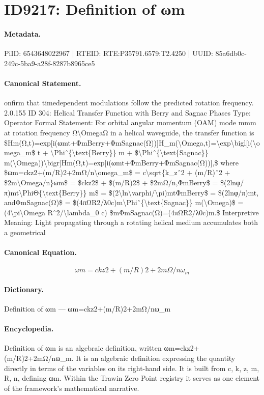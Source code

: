 \section*{ID9217: Definition of ωm}
\paragraph{Metadata.}
PiID: 6543648022967 | RTEID: RTE:P35791.6579:T2.4250 | UUID: 85a6db0c-249c-5ba9-a28f-8287b8965ce5

\paragraph{Canonical Statement.}
onfirm that timedependent modulations follow the predicted rotation frequency. 2.0.155 ID 304: Helical Transfer Function with Berry and Sagnac Phases Type: Operator Formal Statement: For orbital angular momentum (OAM) mode mmm at rotation frequency Ω\textbackslash{}OmegaΩ in a helical waveguide, the transfer function is \$Hm(Ω,t)=exp[i(ωmt+ΦmBerry+ΦmSagnac(Ω))]H\_m(\textbackslash{}Omega,t)=\textbackslash{}exp\textbackslash{}bigl[i(\textbackslash{}omega\_m\$ t + \textbackslash{}Phiˆ\{\textbackslash{}text\{Berry\}\} m + \$\textbackslash{}Phiˆ\{\textbackslash{}text\{Sagnac\}\} m(\textbackslash{}Omega))\textbackslash{}bigr]Hm(Ω,t)=exp[i(ωmt+ΦmBerry+ΦmSagnac(Ω))],\$ where \$ωm=ckz2+(m/R)2+2mΩ/n\textbackslash{}omega\_m\$ = c\textbackslash{}sqrt\{k\_zˆ2 + (m/R)ˆ2 + \$2m\textbackslash{}Omega/n\}ωm\$ = \$ckz2\$ + \$(m/R)2\$ + \$2mΩ/n,ΦmBerry\$ = \$(2lnφ/π)mt\textbackslash{}PhiΘ\{\textbackslash{}text\{Berry\}\} m\$ = \$(2\textbackslash{}ln\textbackslash{}varphi/\textbackslash{}pi)mtΦmBerry\$ = \$(2lnφ/π)mt, andΦmSagnac(Ω)\$ = \$(4πΩR2/λ0c)m\textbackslash{}Phiˆ\{\textbackslash{}text\{Sagnac\}\} m(\textbackslash{}Omega)\$ = (4\textbackslash{}pi\textbackslash{}Omega Rˆ2/\textbackslash{}lambda\_0 c) \$mΦmSagnac(Ω)=(4πΩR2/λ0c)m.\$ Interpretive Meaning: Light propagating through a rotating helical medium accumulates both a geometrical

\paragraph{Canonical Equation.}
\[
ωm=ckz2+(m/R)2+2mΩ/n\omega_m
\]

\paragraph{Dictionary.}
Definition of ωm — ωm=ckz2+(m/R)2+2mΩ/nω\_m

\paragraph{Encyclopedia.}
Definition of ωm is an algebraic definition, written ωm=ckz2+(m/R)2+2mΩ/nω\_m. It is an algebraic definition expressing the quantity directly in terms of the variables on its right-hand side. It is built from c, k, z, m, R, n, defining ωm. Within the Trawin Zero Point registry it serves as one element of the framework's mathematical narrative.
